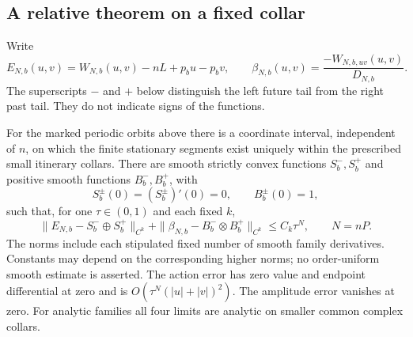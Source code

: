 \subsection{A relative theorem on a fixed collar}

Write
\[
 E_{N,b}(u,v)=W_{N,b}(u,v)-nL+p_bu-p_bv,
 \qquad \beta_{N,b}(u,v)=\frac{-W_{N,b,uv}(u,v)}{D_{N,b}}.
\]
The superscripts $-$ and $+$ below distinguish the left future tail
from the right past tail.  They do not indicate signs of the functions.

\begin{theorem}
\label{thm:v64-periodic-relative}
For the marked periodic orbits above there is a coordinate interval,
independent of $n$, on which the finite stationary segments exist
uniquely within the prescribed small itinerary collars.  There are
smooth strictly convex functions $S_b^-,S_b^+$ and positive smooth
functions $B_b^-,B_b^+$, with
\[
 S_b^\pm(0)=(S_b^\pm)'(0)=0,\qquad B_b^\pm(0)=1,
\]
such that, for one $\tau\in(0,1)$ and each fixed $k$,
\begin{equation}\label{eq:v64-main-relative}
 \|E_{N,b}-S_b^-\oplus S_b^+\|_{C^k}
 +\|\beta_{N,b}-B_b^-\otimes B_b^+\|_{C^k}
                  \le C_k\tau^N,\qquad N=nP.
\end{equation}
The norms include each stipulated fixed number of smooth family
derivatives.  Constants may depend on the corresponding higher norms;
no order-uniform smooth estimate is asserted.  The action error has
zero value and endpoint differential at zero and is
$O(\tau^N(|u|+|v|)^2)$.  The amplitude error vanishes at zero.
For analytic families all four limits are analytic on smaller common
complex collars.
\end{theorem}


